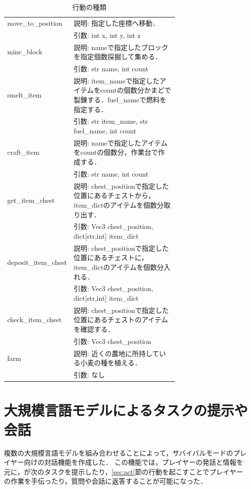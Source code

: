 \begin{table}[H]
    \caption{行動の種類}\label{tab:action}
    \centering
    \begin{tabular}{lp{0.7\linewidth}}
        \hline \hline
        move\_to\_position & 説明: 指定した座標へ移動． \\
        　 & 引数: int x, int y, int z \\
        \hline
        mine\_block & 説明: nameで指定したブロックを指定個数採掘して集める． \\
        　 & 引数: str name, int count \\
        \hline
        smelt\_item & 説明: item\_nameで指定したアイテムをcountの個数分かまどで製錬する．fuel\_nameで燃料を指定する． \\
        　 & 引数: str item\_name, str fuel\_name, int count \\
        \hline
        craft\_item & 説明: nameで指定したアイテムをcountの個数分，作業台で作成する． \\
        　 & 引数: str name, int count \\
        \hline
        get\_item\_chest & 説明: chest\_positionで指定した位置にあるチェストから，item\_dictのアイテムを個数分取り出す． \\
        　 & 引数: Vec3 chest\_position, dict[str,int] item\_dict \\
        \hline
        deposit\_item\_chest & 説明: chest\_positionで指定した位置にあるチェストに，item\_dictのアイテムを個数分入れる． \\
        　 & 引数: Vec3 chest\_position, dict[str,int] item\_dict \\
        \hline
        check\_item\_chest & 説明: chest\_positionで指定した位置にあるチェストのアイテムを確認する． \\
        　 & 引数: Vec3 chest\_position \\
        \hline
        farm & 説明: 近くの農地に所持している小麦の種を植える． \\
        　 & 引数: なし \\
        \hline
    \end{tabular}
\end{table}

\section{大規模言語モデルによるタスクの提示や会話}\label{sec:gpt_res}
複数の大規模言語モデルを組み合わせることによって，サバイバルモードのプレイヤー向けの対話機能を作成した．
この機能では，プレイヤーの発話と情報を元に，{\mason}が次のタスクを提示したり，\ref{sec:act}節の行動を起こすことでプレイヤーの作業を手伝ったり，質問や会話に返答することが可能になった．

